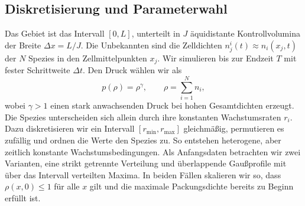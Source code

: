 \documentclass[11pt]{article}
\begin{document}
\subsection{Diskretisierung und Parameterwahl}
Das Gebiet ist das Intervall $[0, L]$, unterteilt in $J$ äquidistante
Kontrollvolumina der Breite $\Delta x = L / J$. Die Unbekannten sind die
Zelldichten $n^{i}_j(t) \approx n_i(x_j, t)$ der $N$ Spezies in den
Zellmittelpunkten $x_j$. Wir simulieren bis zur Endzeit $T$ mit fester
Schrittweite $\Delta t$. Den Druck wählen wir als
\begin{equation}
    p(\rho) = \rho^\gamma, \qquad \rho = \sum_{i=1}^{N} n_i,
\end{equation}
wobei $\gamma > 1$ einen stark anwachsenden Druck bei hohen Gesamtdichten
erzeugt. Die Spezies unterscheiden sich allein durch ihre konstanten
Wachstumsraten $r_i$. Dazu diskretisieren wir ein Intervall $[r_{\min},
r_{\max}]$ gleichmäßig, permutieren es zufällig und ordnen die Werte den Spezies
zu. So entstehen heterogene, aber zeitlich konstante Wachstumsbedingungen. Als
Anfangsdaten betrachten wir zwei Varianten, eine strikt getrennte Verteilung und
überlappende Gaußprofile mit über das Intervall verteilten Maxima. In beiden
Fällen skalieren wir so, dass $\rho(x, 0) \le 1$ für alle $x$ gilt und die
maximale Packungsdichte bereits zu Beginn erfüllt ist.
\end{document}
